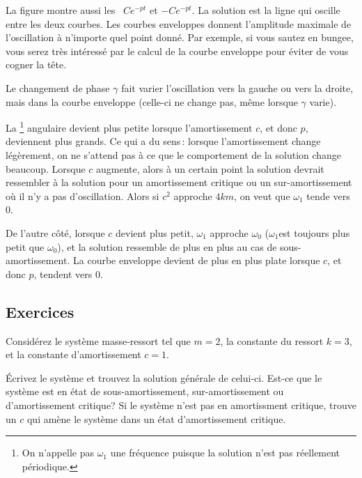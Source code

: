 
La figure montre aussi les~\emph{}
$C e^{-pt}$ et $-C e^{-pt}$.  La solution est la ligne qui oscille entre les deux courbes. Les courbes enveloppes donnent l'amplitude maximale de l'oscillation à n'importe quel point donné. Par exemple, si vous sautez en bungee, vous serez très intéressé par le calcul de la courbe enveloppe pour éviter de vous cogner la tête. 

Le changement de phase $\gamma$ fait varier l'oscillation vers la gauche ou vers la droite, mais dans la courbe enveloppe (celle-ci ne change pas, même lorsque $\gamma$
varie).


La 
\emph{}\footnote{On n'appelle pas $\omega_1$ une fréquence puisque la solution n'est pas réellement périodique.} angulaire devient plus petite lorsque l'amortissement 
$c$, et donc $p$, deviennent plus grands. Ce qui a du sens\,: lorsque l'amortissement change légèrement, on ne s'attend pas à ce que le comportement de la solution change beaucoup. Lorsque $c$ augmente,  alors à un certain point la solution devrait ressembler à la solution pour un amortissement critique ou un sur-amortissement où il n'y a pas d'oscillation. Alors si $c^2$ approche $4km$, on veut que $\omega_1$ tende vers 0.

De l'autre côté, lorsque $c$ devient plus petit, $\omega_1$ approche $\omega_0$
($\omega_1$est toujours plus petit que $\omega_0$), et la solution ressemble de plus en plus au cas de sous-amortissement. La courbe enveloppe devient de plus en plus plate lorsque $c$, et donc $p$, tendent vers 0.

\subsection{Exercices}

\begin{samepage}
\begin{exercise} \label{mv:ex1}
Considérez le système masse-ressort  tel que $m=2$, la constante du ressort $k=3$, et la constante d'amortissement $c=1$.
\begin{tasks}
\task Écrivez le système et trouvez la solution générale de celui-ci.
\task Est-ce que le système est en état de  sous-amortissement, sur-amortissement ou d'amortissement critique? 
\task Si le système n'est pas en amortissment critique, trouve un $c$ qui amène le système dans un état d'amortissement critique. 
\end{tasks}
\end{exercise}
\end{samepage}

